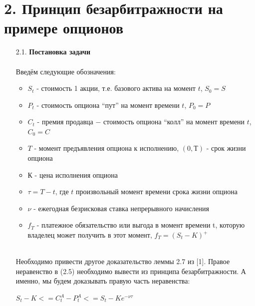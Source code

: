 \documentclass[12pt,a4 paper]{book}
\begin{document}
\section*{2. Принцип безарбитражности на примере опционов}
\smallskip
\begin{enumerate}
\item[2.1.] \textbf{Постановка задачи}
\\
\\Введём следующие обозначения:
\smallskip
\begin{itemize}
    \item $S_t$ - стоимость 1 акции, т.е. базового актива на момент $t$, $S_0 = S$
    \item$P_t$ - стоимость опциона “пут” на момент времени $t$, $P_0=P$
    \item$C_t$ - премия продавца $-$ стоимость опциона “колл” на момент времени $t$, $C_0=C$
    \item$T$ - момент предъявления опциона к исполнению,
    $(0,Т)$ - срок жизни опциона
    \item $К$ - цена исполнения опциона
    \item$\tau=T-t$, где $t$ произвольный момент времени срока жизни опциона
    \item$\nu$ - ежегодная безрисковая ставка непрерывного начисления
    \item$f_T$ - платежное обязательство или выгода в момент времени t, которую владелец может получить в этот момент, $f_T=(S_t-K)^{+}$
\end{itemize}
\smalskip
\\ Необходимо привести другое доказательство леммы 2.7 из [1]. Правое неравенство в (2.5) необходимо вывести из принципа безарбитражности. А именно, мы будем доказывать правую часть неравенства:
\begin{center}
    $S_t - K <= C^{A}_t-P^{A}_t<=S_t - Ke^{-\nu\tau}$
\end{center}


\end{enumerate}
\end{document}
